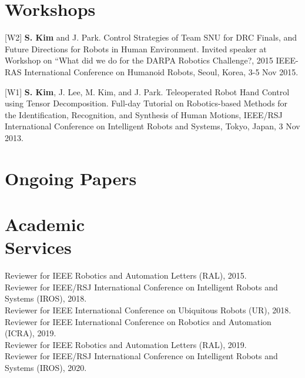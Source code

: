 \documentclass[margin,line]{res}
\begin{document}
\begin{resume}
  \section{\sc Workshops}
   [W2] \textbf{S. Kim} and {J. Park}.
  Control Strategies of Team SNU for DRC Finals, and Future Directions for Robots in Human Environment.
  Invited speaker at Workshop on “What did we do for the DARPA Robotics Challenge?,
  2015 IEEE-RAS International Conference on Humanoid Robots,
  Seoul, Korea, 3-5 Nov 2015.

    [W1] \textbf{S. Kim}, J. Lee, M. Kim, and {J. Park}.
  Teleoperated Robot Hand Control using Tensor Decomposition.
  Full-day Tutorial on Robotics-based Methods for the Identification, Recognition, and Synthesis of Human Motions,
  IEEE/RSJ International Conference on Intelligent Robots and Systems,
  Tokyo, Japan, 3 Nov 2013.

  \section{\sc Ongoing Papers}


  \section{\sc Academic \\Services}

  Reviewer for IEEE Robotics and Automation Letters (RAL), 2015. \\
  Reviewer for IEEE/RSJ International Conference on Intelligent Robots and Systems (IROS), 2018. \\
  Reviewer for IEEE International Conference on Ubiquitous Robots (UR), 2018.\\
  Reviewer for IEEE International Conference on Robotics and Automation (ICRA), 2019. \\
  Reviewer for IEEE Robotics and Automation Letters (RAL), 2019. \\
  Reviewer for IEEE/RSJ International Conference on Intelligent Robots and Systems (IROS), 2020. \\
\end{resume}
\end{document}
